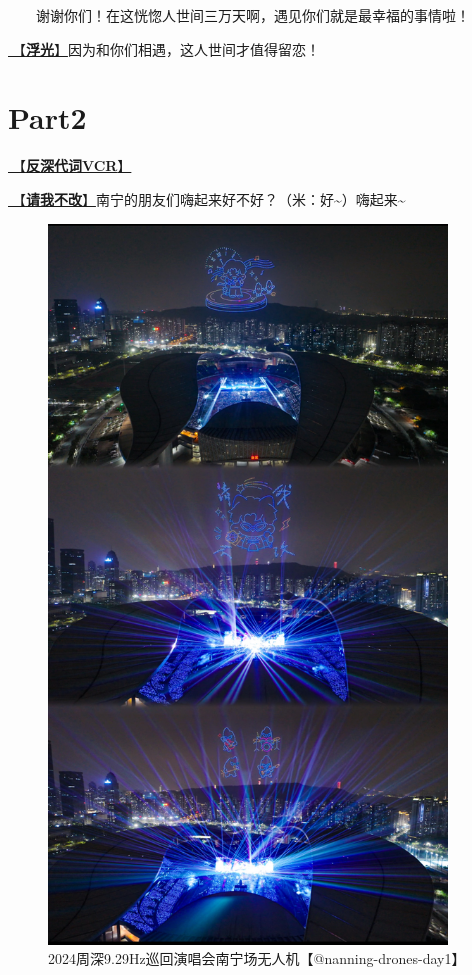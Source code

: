 \documentclass[]{ctexbook}
\begin{document}
  谢谢你们！在这恍惚人世间三万天啊，遇见你们就是最幸福的事情啦！

\hyperref[floating-light]{🎵【\textbf{浮光}】}因为和你们相遇，这人世间才值得留恋！

\section{Part2}\label{nanning-20241206-part2}

\hyperref[senself-vcr]{🎥【\textbf{反深代词VCR}】}

\hyperref[brave-heart]{🎵【\textbf{请我不改}】}南宁的朋友们嗨起来好不好？（米：好\textasciitilde）嗨起来\textasciitilde{}

\begin{figure}

{\centering \includegraphics[width=300pt]{img/nanning20241206/001} 

}

\caption{2024周深9.29Hz巡回演唱会南宁场无人机【@nanning-drones-day1】}\label{fig:unnamed-chunk-137}
\end{figure}
\end{document}
